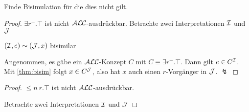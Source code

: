\begin{tafel}[Beweisskizze] Finde Bisimulation für die dies nicht gilt.

\begin{proof} $\exists r^{-}.\top$ ist nicht $\mathcal{A}\mathcal{L}\mathcal{C}$-ausdrückbar.
 Betrachte zwei Interpretationen $\mathcal{I}$ und $\mathcal{J}$

 \begin{center}

     $(\mathcal{I}, e) \sim (\mathcal{J}, x)$ bisimilar
 \end{center}

Angenommen, es gäbe ein $\mathcal{A}\mathcal{L}\mathcal{C}$-Konzept $C$ mit $C \equiv \exists r^{-}.\top$. Dann gilt $e \in C^{\mathcal{I}}$. Mit \autoref{thm:bisim} folgt $x \in C^{\mathcal{J}}$, also hat $x$ auch einen $r$-Vorgänger in $\mathcal{J}$. $\lightning$
\end{proof} 

\begin{proof} $\leq n\ r.\top$ ist nicht $\mathcal{A}\mathcal{L}\mathcal{C}$-ausdrückbar.

Betrachte zwei Interpretationen $\mathcal{I}$ und $\mathcal{J}$


\end{proof}
\end{tafel}
